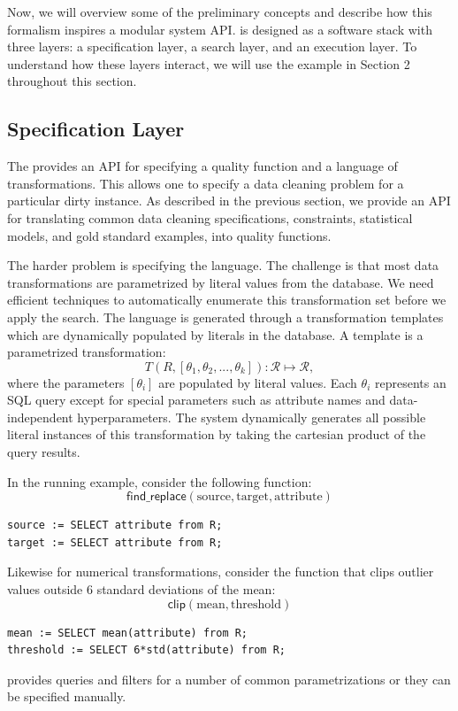 

Now, we will overview some of the preliminary concepts and describe how this formalism inspires a modular system API.
\sys is designed as a software stack with three layers: a specification layer, a search layer, and an execution layer.
To understand how these layers interact, we will use the example in Section 2 throughout this section.


\subsection{Specification Layer} The provides an API for specifying a quality function and a language of transformations. This allows one to specify a data cleaning problem for a particular dirty instance. As described in the previous section, we provide an API for translating common data cleaning specifications, constraints, statistical models, and gold standard examples, into quality functions. 

The harder problem is specifying the language. 
The challenge is that most data transformations are parametrized by literal values from the database.
We need efficient techniques to automatically enumerate this transformation set before we apply the search.
The language is generated through a transformation templates which are dynamically populated by literals in the database.
A template is a parametrized transformation:
\[T(R, [\theta_1, \theta_2,...,\theta_k] ): \mathcal{R} \mapsto  \mathcal{R},\] where the parameters $[\theta_i]$ are populated by literal values.
Each $\theta_i$ represents an SQL query except for special parameters such as attribute names and data-independent hyperparameters.
The system dynamically generates all possible literal instances of this transformation by taking the cartesian product of the query results.

In the running example, consider the following function:
\[
\textsf{find\_replace}(\text{source}, \text{target}, \text{attribute})
\]
\begin{lstlisting}
source := SELECT attribute from R;
target := SELECT attribute from R;
\end{lstlisting}
Likewise for numerical transformations, consider the function that clips outlier values outside 6 standard deviations of the mean:
\[
\textsf{clip}(\text{mean}, \text{threshold})
\]
\begin{lstlisting}
mean := SELECT mean(attribute) from R;
threshold := SELECT 6*std(attribute) from R;
\end{lstlisting}
\sys provides queries and filters for a number of common parametrizations or they can be specified manually.

